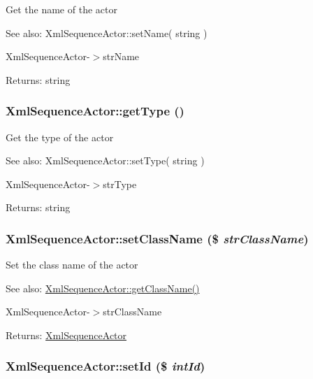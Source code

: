 Get the name of the actor

\begin{Desc}
\item[See also:]XmlSequenceActor::setName( string ) 

XmlSequenceActor-$>$strName \end{Desc}
\begin{Desc}
\item[Returns:]string \end{Desc}
\hypertarget{class_xml_sequence_actor_d0be22bbf0425675beabb6f3ea81a8e5}{
\subsubsection[{getType}]{\setlength{\rightskip}{0pt plus 5cm}XmlSequenceActor::getType ()}}
\label{class_xml_sequence_actor_d0be22bbf0425675beabb6f3ea81a8e5}


Get the type of the actor

\begin{Desc}
\item[See also:]XmlSequenceActor::setType( string ) 

XmlSequenceActor-$>$strType \end{Desc}
\begin{Desc}
\item[Returns:]string \end{Desc}
\hypertarget{class_xml_sequence_actor_53cd7e43931750fc57a198cb00d2ba24}{
\subsubsection[{setClassName}]{\setlength{\rightskip}{0pt plus 5cm}XmlSequenceActor::setClassName (\$ {\em strClassName})}}
\label{class_xml_sequence_actor_53cd7e43931750fc57a198cb00d2ba24}


Set the class name of the actor

\begin{Desc}
\item[See also:]\hyperlink{class_xml_sequence_actor_a0e9b0bda1ded8557d7ea610dddb7fed}{XmlSequenceActor::getClassName()} 

XmlSequenceActor-$>$strClassName \end{Desc}
\begin{Desc}
\item[Returns:]\hyperlink{class_xml_sequence_actor}{XmlSequenceActor} \end{Desc}
\hypertarget{class_xml_sequence_actor_89df5af9ea1af66ca409443fba39a3e4}{
\subsubsection[{setId}]{\setlength{\rightskip}{0pt plus 5cm}XmlSequenceActor::setId (\$ {\em intId})}}
\label{class_xml_sequence_actor_89df5af9ea1af66ca409443fba39a3e4}



